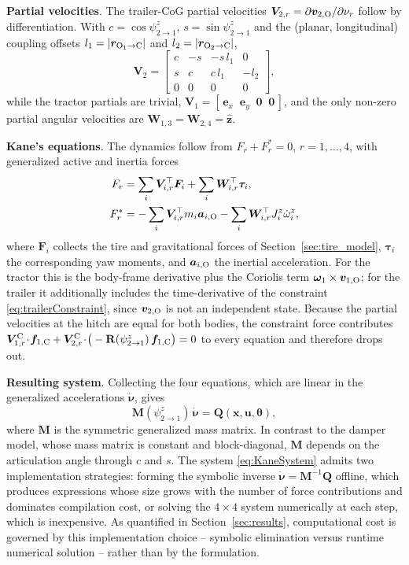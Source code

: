 \documentclass[conference]{IEEEtran}
\begin{document}
\textbf{Partial velocities}. The trailer-CoG partial velocities $\bm V_{2,r} = \partial \bm v_{2,\text{O}}/\partial\nu_r$ follow by differentiation. With $c=\cos\psi^z_{2\to1}$, $s=\sin\psi^z_{2\to1}$ and the (planar, longitudinal) coupling offsets $l_1 = |\bm r_{\text{O}_1\to\text{C}}|$ and $l_2 = |\bm r_{\text{O}_2\to\text{C}}|$,
\begin{equation}
\bm V_2 = \begin{bmatrix} c & -s & -s\,l_1 & 0 \\ s & c & c\,l_1 & -l_2 \\ 0 & 0 & 0 & 0 \end{bmatrix},
\end{equation}
while the tractor partials are trivial, $\bm V_1 = [\,\bm e_x\;\;\bm e_y\;\;\bm 0\;\;\bm 0\,]$, and the only non-zero partial angular velocities are $\bm W_{1,3} = \bm W_{2,4} = \hat{\bm z}$.

\textbf{Kane's equations}. The dynamics follow from $F_r + F_r^\ast = 0$, $r=1,\dots,4$, with generalized active and inertia forces
\begin{align}
F_r &= \sum_{i} \bm V_{i,r}^\top \bm F_i + \sum_i \bm W_{i,r}^\top \bm\tau_i, \\
F_r^\ast &= -\sum_i \bm V_{i,r}^\top m_i \bm a_{i,\text{O}} - \sum_i \bm W_{i,r}^\top J^z_i \dot\omega^z_i,
\end{align}
where $\bm F_i$ collects the tire and gravitational forces of Section~\ref{sec:tire_model}, $\bm\tau_i$ the corresponding yaw moments, and $\bm a_{i,\text{O}}$ the inertial acceleration. For the tractor this is the body-frame derivative plus the Coriolis term $\bm\omega_1\times\bm v_{1,\text{O}}$; for the trailer it additionally includes the time-derivative of the constraint \eqref{eq:trailerConstraint}, since $\bm v_{2,\text{O}}$ is not an independent state. Because the partial velocities at the hitch are equal for both bodies, the constraint force contributes $\bm V^{\text{C}}_{1,r}\!\cdot\!\bm f_{1,\text{C}} + \bm V^{\text{C}}_{2,r}\!\cdot\!\big(-\mathbf R(\psi^z_{2\to1})\,\bm f_{1,\text{C}}\big) = 0$ to every equation and therefore drops out.

\textbf{Resulting system}. Collecting the four equations, which are linear in the generalized accelerations $\dot{\bm\nu}$, gives
\begin{equation}
\bm M(\psi^z_{2\to1})\,\dot{\bm\nu} = \bm Q(\bm x,\bm u,\bm\theta), \label{eq:KaneSystem}
\end{equation}
where $\bm M$ is the symmetric generalized mass matrix. In contrast to the damper model, whose mass matrix is constant and block-diagonal, $\bm M$ depends on the articulation angle through $c$ and $s$. The system \eqref{eq:KaneSystem} admits two implementation strategies: forming the symbolic inverse $\dot{\bm\nu} = \bm M^{-1}\bm Q$ offline, which produces expressions whose size grows with the number of force contributions and dominates compilation cost, or solving the $4\times4$ system numerically at each step, which is inexpensive. As quantified in Section~\ref{sec:results}, computational cost is governed by this implementation choice -- symbolic elimination versus runtime numerical solution -- rather than by the formulation.
\end{document}

